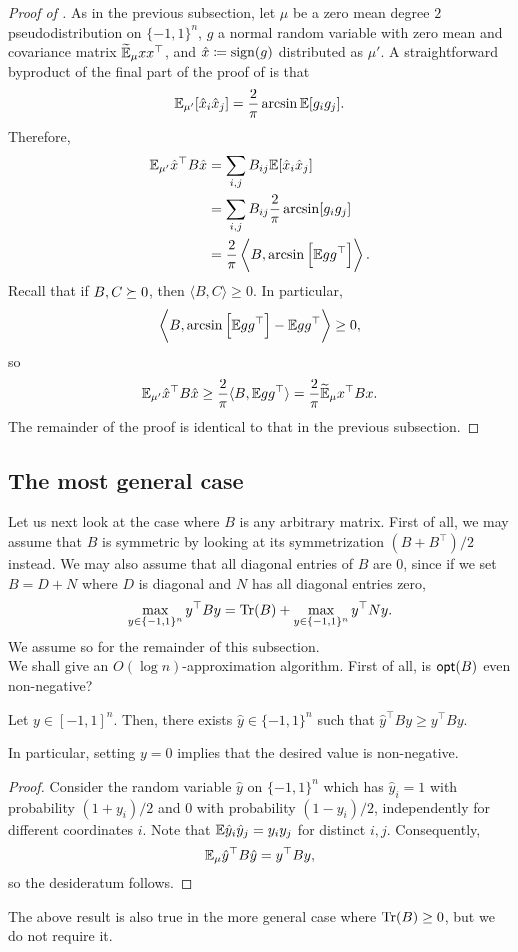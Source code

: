 	\begin{proof}[Proof of ]
		As in the previous subsection, let $\mu$ be a zero mean degree $2$ pseudodistribution on $\{-1,1\}^n$, $g$ a normal random variable with zero mean and covariance matrix $\widetilde{\mathbb{E}}_\mu xx^\top$, and $\hat{x} \coloneqq \operatorname{sign}(g)$ distributed as $\mu'$. A straightforward byproduct of the final part of the proof of  is that
		\[ \mathbb{E}_{\mu'}[\hat{x}_i \hat{x}_j] = \frac{2}{\pi} \arcsin\mathbb{E}[g_ig_j]. \]
		Therefore,
		\begin{align*}
			\mathbb{E}_{\mu'} \hat{x}^\top B \hat{x} &= \sum_{i,j} B_{ij} \mathbb{E}[\hat{x}_i \hat{x}_j] \\
				&= \sum_{i,j} B_{ij} \frac{2}{\pi} \arcsin[g_i g_j] \\
				&= \frac{2}{\pi} \left\langle B , \arcsin\left[\mathbb{E} gg^\top\right] \right\rangle.
		\end{align*}
		Recall that if $B,C \succeq 0$, then $\langle B,C\rangle \ge 0$. In particular,
		\[ \left\langle B , \arcsin\left[\mathbb{E} gg^\top\right] - \mathbb{E} gg^\top \right\rangle \ge 0, \]
		so
		\[ \mathbb{E}_{\mu'} \hat{x}^\top B \hat{x} \ge \frac{2}{\pi} \langle B,\mathbb{E} gg^\top\rangle = \frac{2}{\pi} \widetilde{\mathbb{E}}_\mu x^\top B x. \]
		The remainder of the proof is identical to that in the previous subsection.
	\end{proof}



\subsection{The most general case}

	Let us next look at the case where $B$ is any arbitrary matrix. First of all, we may assume that $B$ is symmetric by looking at its symmetrization $(B+B^\top)/2$ instead.
	We may also assume that all diagonal entries of $B$ are $0$, since if we set $B = D + N$ where $D$ is diagonal and $N$ has all diagonal entries zero,
	\[ \max_{y \in \{-1,1\}^n} y^\top B y = \operatorname{Tr}(B) + \max_{y \in \{-1,1\}^n} y^\top N y. \]
	We assume so for the remainder of this subsection.\\
	We shall give an $O(\log n)$-approximation algorithm. First of all, is $\mathsf{opt}(B)$ even non-negative?

	\begin{fprop}
		\label{prop: solid-to-discrete-hypercube}
		Let $y \in [-1,1]^n$. Then, there exists $\hat{y} \in \{-1,1\}^n$ such that $\hat{y}^\top B y \ge y^\top B y$.
	\end{fprop}
	In particular, setting $y = 0$ implies that the desired value is non-negative.
	\begin{proof}
		Consider the random variable $\hat{y}$ on $\{-1,1\}^n$ which has $\hat{y}_i = 1$ with probability $(1+y_i)/2$ and $0$ with probability $(1-y_i)/2$, independently for different coordinates $i$. Note that $\mathbb{E} \hat{y}_i \hat{y}_j = y_i y_j$ for distinct $i, j$. Consequently,
		\[ \mathbb{E}_\mu \hat{y}^\top B \hat{y} = y^\top B y, \]
		so the desideratum follows.
	\end{proof}
	The above result is also true in the more general case where $\operatorname{Tr}(B) \ge 0$, but we do not require it.\\

